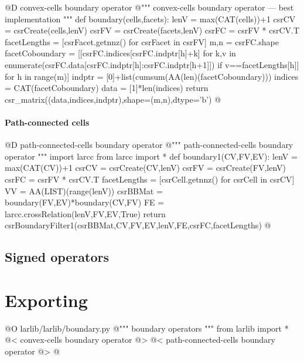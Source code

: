 \documentclass[11pt,oneside]{article}	%
\begin{document}
@D convex-cells boundary operator
@{""" convex-cells boundary operator --- best implementation """
def boundary(cells,facets):
    lenV = max(CAT(cells))+1
    csrCV = csrCreate(cells,lenV)
    csrFV = csrCreate(facets,lenV)
    csrFC = csrFV * csrCV.T
    facetLengths = [csrFacet.getnnz() for csrFacet in csrFV]
    m,n = csrFC.shape
    facetCoboundary = [[csrFC.indices[csrFC.indptr[h]+k] 
        for k,v in enumerate(csrFC.data[csrFC.indptr[h]:csrFC.indptr[h+1]]) 
            if v==facetLengths[h]] for h in range(m)]
    indptr = [0]+list(cumsum(AA(len)(facetCoboundary)))
    indices = CAT(facetCoboundary)
    data = [1]*len(indices)
    return csr_matrix((data,indices,indptr),shape=(m,n),dtype='b')
@}


\paragraph{Path-connected cells}

@D path-connected-cells boundary operator
@{""" path-connected-cells boundary operator """
import larcc
from larcc import *
def boundary1(CV,FV,EV):
    lenV = max(CAT(CV))+1
    csrCV = csrCreate(CV,lenV)
    csrFV = csrCreate(FV,lenV)
    csrFC = csrFV * csrCV.T
    facetLengths = [csrCell.getnnz() for csrCell in csrCV]
    VV = AA(LIST)(range(lenV))
    csrBBMat = boundary(FV,EV)*boundary(CV,FV)
    FE = larcc.crossRelation(lenV,FV,EV,True)
    return csrBoundaryFilter1(csrBBMat,CV,FV,EV,lenV,FE,csrFC,facetLengths)
@}

\subsection{Signed operators}


\section{Exporting}

@O larlib/larlib/boundary.py
@{""" boundary operators """
from larlib import *
@< convex-cells boundary operator @>
@< path-connected-cells boundary operator @>
@}
\end{document}
